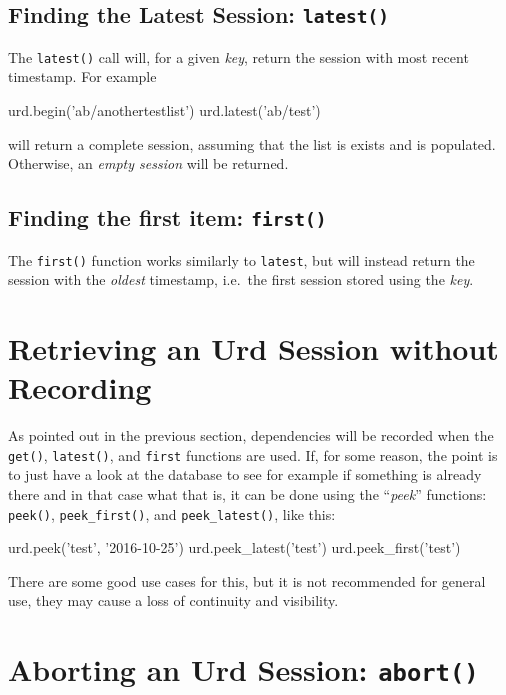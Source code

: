 \subsection{Finding the Latest Session:  \texttt{latest()}}
The \texttt{latest()} call will, for a given \textsl{key}, return the
session with most recent timestamp.  For example
\begin{python}
urd.begin('ab/anothertestlist')
urd.latest('ab/test')
\end{python}
will return a complete session, assuming that the list is exists and
is populated.  Otherwise, an \textsl{empty session} will be returned.



\subsection{Finding the first item:  \texttt{first()}}
The \texttt{first()} function works similarly to \texttt{latest}, but
will instead return the session with the \textsl{oldest} timestamp,
i.e.\ the first session stored using the \textsl{key}.





\section{Retrieving an Urd Session without Recording}
\label{sec:avoid_recording_urd_deps}
As pointed out in the previous section, dependencies will be recorded
when the \texttt{get()}, \texttt{latest()}, and \texttt{first}
functions are used.  If, for some reason, the point is to just have a
look at the database to see for example if something is already there
and in that case what that is, it can be done using the
``\textsl{peek}'' functions: \texttt{peek()}, \texttt{peek\_first()},
and
\texttt{peek\_latest()}, like this:
\begin{python}
urd.peek('test', '2016-10-25')
urd.peek_latest('test')
urd.peek_first('test')
\end{python}
There are some good use cases for this, but it is not recommended for
general use, they may cause a loss of continuity and visibility.





\section{Aborting an Urd Session:  \texttt{abort()}}

